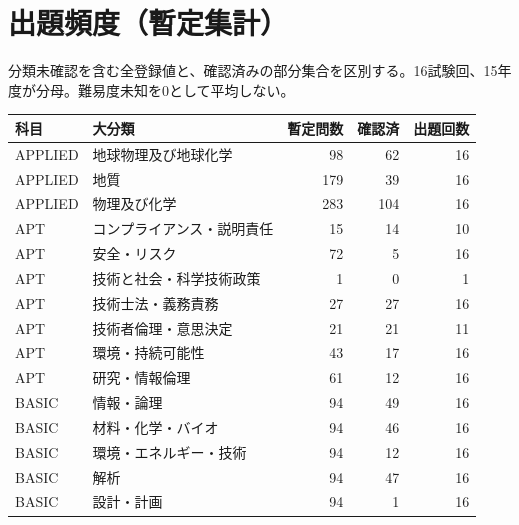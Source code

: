 \chapter{出題頻度（暫定集計）}
分類未確認を含む全登録値と、確認済みの部分集合を区別する。16試験回、15年度が分母。難易度未知を0として平均しない。
\begin{longtable}{p{.16\linewidth}p{.42\linewidth}rrr}
科目 & 大分類 & 暫定問数 & 確認済 & 出題回数\\\hline
APPLIED & 地球物理及び地球化学 & 98 & 62 & 16\\
APPLIED & 地質 & 179 & 39 & 16\\
APPLIED & 物理及び化学 & 283 & 104 & 16\\
APT & コンプライアンス・説明責任 & 15 & 14 & 10\\
APT & 安全・リスク & 72 & 5 & 16\\
APT & 技術と社会・科学技術政策 & 1 & 0 & 1\\
APT & 技術士法・義務責務 & 27 & 27 & 16\\
APT & 技術者倫理・意思決定 & 21 & 21 & 11\\
APT & 環境・持続可能性 & 43 & 17 & 16\\
APT & 研究・情報倫理 & 61 & 12 & 16\\
BASIC & 情報・論理 & 94 & 49 & 16\\
BASIC & 材料・化学・バイオ & 94 & 46 & 16\\
BASIC & 環境・エネルギー・技術 & 94 & 12 & 16\\
BASIC & 解析 & 94 & 47 & 16\\
BASIC & 設計・計画 & 94 & 1 & 16\\
\end{longtable}

